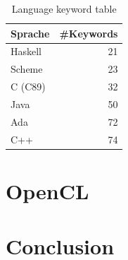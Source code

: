 \documentclass{scrartcl}
\begin{document}
\begin{table}
  \caption{Language keyword table}
  \label{tab:lang}
  \begin{tabular}{lr}
    \toprule
    Sprache  & \#Keywords \\
    \midrule
    Haskell  & 21         \\
    Scheme   & 23         \\
    C (C89)  & 32         \\
    Java     & 50         \\
    Ada      & 72         \\
    C++      & 74         \\
    \bottomrule
  \end{tabular}
\end{table}

\section{OpenCL}

\section{Conclusion}

\printbibliography
\end{document}

